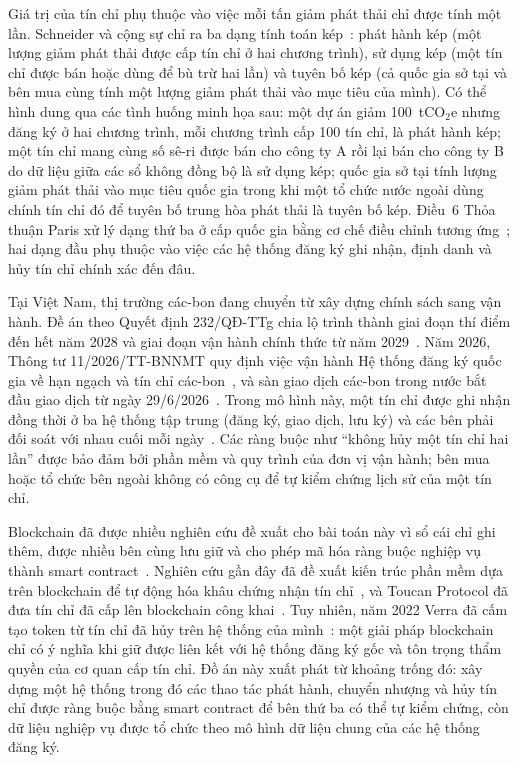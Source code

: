 Giá trị của tín chỉ phụ thuộc vào việc mỗi tấn giảm phát thải chỉ được tính một lần. Schneider và cộng sự chỉ ra ba dạng tính toán kép~\cite{schneider2019double}: phát hành kép (một lượng giảm phát thải được cấp tín chỉ ở hai chương trình), sử dụng kép (một tín chỉ được bán hoặc dùng để bù trừ hai lần) và tuyên bố kép (cả quốc gia sở tại và bên mua cùng tính một lượng giảm phát thải vào mục tiêu của mình). Có thể hình dung qua các tình huống minh họa sau: một dự án giảm 100~tCO$_2$e nhưng đăng ký ở hai chương trình, mỗi chương trình cấp 100 tín chỉ, là phát hành kép; một tín chỉ mang cùng số sê-ri được bán cho công ty A rồi lại bán cho công ty B do dữ liệu giữa các sổ không đồng bộ là sử dụng kép; quốc gia sở tại tính lượng giảm phát thải vào mục tiêu quốc gia trong khi một tổ chức nước ngoài dùng chính tín chỉ đó để tuyên bố trung hòa phát thải là tuyên bố kép. Điều~6 Thỏa thuận Paris xử lý dạng thứ ba ở cấp quốc gia bằng cơ chế điều chỉnh tương ứng~\cite{unfccc2022cma3}; hai dạng đầu phụ thuộc vào việc các hệ thống đăng ký ghi nhận, định danh và hủy tín chỉ chính xác đến đâu.

Tại Việt Nam, thị trường các-bon đang chuyển từ xây dựng chính sách sang vận hành. Đề án theo Quyết định 232/QĐ-TTg chia lộ trình thành giai đoạn thí điểm đến hết năm 2028 và giai đoạn vận hành chính thức từ năm 2029~\cite{vietnam2025qd232}. Năm 2026, Thông tư 11/2026/TT-BNNMT quy định việc vận hành Hệ thống đăng ký quốc gia về hạn ngạch và tín chỉ các-bon~\cite{vietnam2026thongtu11}, và sàn giao dịch các-bon trong nước bắt đầu giao dịch từ ngày 29/6/2026~\cite{hnx2026vn2025}. Trong mô hình này, một tín chỉ được ghi nhận đồng thời ở ba hệ thống tập trung (đăng ký, giao dịch, lưu ký) và các bên phải đối soát với nhau cuối mỗi ngày~\cite{vietnam2026thongtu11}. Các ràng buộc như ``không hủy một tín chỉ hai lần'' được bảo đảm bởi phần mềm và quy trình của đơn vị vận hành; bên mua hoặc tổ chức bên ngoài không có công cụ để tự kiểm chứng lịch sử của một tín chỉ.

Blockchain đã được nhiều nghiên cứu đề xuất cho bài toán này vì sổ cái chỉ ghi thêm, được nhiều bên cùng lưu giữ và cho phép mã hóa ràng buộc nghiệp vụ thành smart contract~\cite{kim2020blockchain,sipthorpe2022blockchain}. Nghiên cứu gần đây đã đề xuất kiến trúc phần mềm dựa trên blockchain để tự động hóa khâu chứng nhận tín chỉ~\cite{vaccargiu2026blockchain}, và Toucan Protocol đã đưa tín chỉ đã cấp lên blockchain công khai~\cite{toucan2025docs}. Tuy nhiên, năm 2022 Verra đã cấm tạo token từ tín chỉ đã hủy trên hệ thống của mình~\cite{verra2022crypto}: một giải pháp blockchain chỉ có ý nghĩa khi giữ được liên kết với hệ thống đăng ký gốc và tôn trọng thẩm quyền của cơ quan cấp tín chỉ. Đồ án này xuất phát từ khoảng trống đó: xây dựng một hệ thống trong đó các thao tác phát hành, chuyển nhượng và hủy tín chỉ được ràng buộc bằng smart contract để bên thứ ba có thể tự kiểm chứng, còn dữ liệu nghiệp vụ được tổ chức theo mô hình dữ liệu chung của các hệ thống đăng ký.

